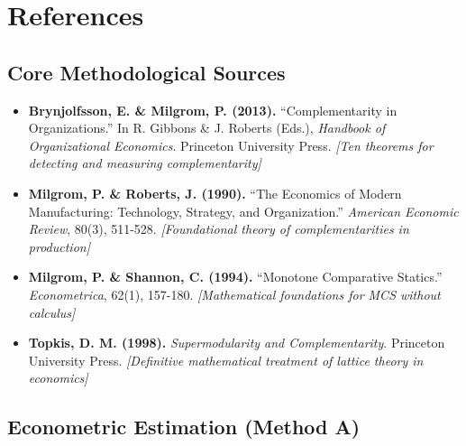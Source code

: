 \documentclass[11pt,a4paper]{article}
\theoremstyle{definition}
\begin{document}
\section{References}
\label{sec:bbb-references}

\subsection{Core Methodological Sources}

\begin{itemize}

\item \textbf{Brynjolfsson, E. \& Milgrom, P. (2013).} 
``Complementarity in Organizations.'' 
In R. Gibbons \& J. Roberts (Eds.), \textit{Handbook of Organizational Economics}. 
Princeton University Press.
\textit{[Ten theorems for detecting and measuring complementarity]}

\item \textbf{Milgrom, P. \& Roberts, J. (1990).} 
``The Economics of Modern Manufacturing: Technology, Strategy, and Organization.'' 
\textit{American Economic Review}, 80(3), 511-528.
\textit{[Foundational theory of complementarities in production]}

\item \textbf{Milgrom, P. \& Shannon, C. (1994).} 
``Monotone Comparative Statics.'' 
\textit{Econometrica}, 62(1), 157-180.
\textit{[Mathematical foundations for MCS without calculus]}

\item \textbf{Topkis, D. M. (1998).} 
\textit{Supermodularity and Complementarity}. 
Princeton University Press.
\textit{[Definitive mathematical treatment of lattice theory in economics]}

\end{itemize}

\subsection{Econometric Estimation (Method A)}
\end{document}
